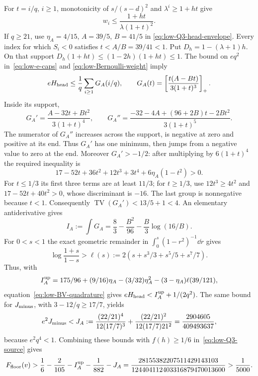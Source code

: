 For $t=i/q$, $i\ge1$, monotonicity of $s/(s-d)^2$ and
$\lambda^i\ge1+ht$ give
\begin{equation}\label{eq:low-Bernoulli-weight}
 w_i\le\frac{1+ht}{\lambda(1+t)^2}.
\end{equation}
If $q\ge21$, use $\eta_A=4/15$, $A=39/5$, $B=41/5$ in
\eqref{eq:low-Q3-head-envelope}. Every index for which $S_i<0$ satisfies
$t<A/B=39/41<1$.
Put $D_h=1-(\lambda+1)h$.
On that support $D_h(1+ht)\le(1-2h)(1+ht)\le1$.
The bound on $eq^2$ in~\eqref{eq:low-e-caps} and
\eqref{eq:low-Bernoulli-weight} imply
\[
 eH_{\rm head}\le\frac1q\sum_{i\ge1}G_A(i/q),\qquad
 G_A(t)=\left[\frac{t(A-Bt)}{3(1+t)^3}\right]_+.
\]
Inside its support,
\[
 G_A'=\frac{A-32t+Bt^2}{3(1+t)^4},\qquad
 G_A''=\frac{-32-4A+(96+2B)t-2Bt^2}{3(1+t)^5}.
\]
The numerator of $G_A''$ increases across the support, is negative
at zero and positive at its end.  Thus $G_A'$ has one minimum,
then jumps from a negative value to zero at the end.
Moreover $G_A'>-1/2$: after multiplying by $6(1+t)^4$ the
required inequality is
\[
 17-52t+36t^2+12t^3+3t^4+6\eta_A(1-t^2)>0.
\]
For $t\le1/3$ its first three terms are at least $11/3$; for
$t\ge1/3$, use $12t^3\ge4t^2$ and
$17-52t+40t^2>0$, whose discriminant is $-16$.
The last group is nonnegative because $t<1$.
Consequently $\operatorname{TV}(G_A')<13/5+1<4$.
An elementary antiderivative gives
\[
 I_A:=\int G_A=\frac83-\frac{B^2}{96}-\frac B3\log(16/B).
\]
For $0<s<1$ the exact geometric remainder in
$\int_0^s(1-r^2)^{-1}\dd r$ gives
\begin{equation}\label{eq:low-log-four}
 \log\frac{1+s}{1-s}>\ell(s):=2(s+s^3/3+s^5/5+s^7/7).
\end{equation}
Thus, with
\[
 I_A^{\rm up}=175/96+(9/16)\eta_A-(3/32)\eta_A^2
                    -(3-\eta_A)\ell(39/121),
\]
equation~\eqref{eq:low-BV-quadrature} gives
$eH_{\rm head}<I_A^{\rm up}+1/(2q^2)$.
The same bound for $J_{\rm minus}$, with $3-12/q\ge17/7$, yields
\[
 e^2J_{\rm minus}<
 J_A:=\frac{(22/21)^4}{12(17/7)^3}
               +\frac{(22/21)^2}{12(17/7)21^2}
       =\frac{2904605}{409493637},
\]
because $e^2q^4<1$.
Combining these bounds with $f(h)\ge1/6$ in~\eqref{eq:low-Q3-source}
gives
\[
 F_{\rm floor}(v)>
 \frac16-\frac2{105}-I_A^{\rm up}-\frac1{882}-J_A
 =\frac{28155382207511429143103}{124404112403316879470013600}
 >\frac1{5000}.
\]

